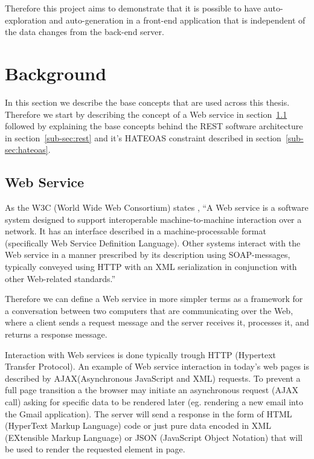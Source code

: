 Therefore this project aims to demonstrate that it is possible to have auto-exploration and auto-generation in a front-end application that is independent of the data changes from the back-end server.


\section{Background}
\label{sec:background}

In this section we describe the base concepts that are used across this thesis. Therefore we start by describing the concept of a Web service in section~\ref{sub-sec:web-service} followed by explaining the base concepts behind the REST software architecture in section~\ref{sub-sec:rest} and it's HATEOAS constraint described in section~\ref{sub-sec:hateoas}.

\subsection{Web Service}
\label{sub-sec:web-service}

As the W3C (World Wide Web Consortium) states \cite{W3C}, ``A Web service is a software system designed to support interoperable machine-to-machine interaction over a network. It has an interface described in a machine-processable format (specifically Web Service Definition Language). Other systems interact with the Web service in a manner prescribed by its description using SOAP-messages, typically conveyed using HTTP with an XML serialization in conjunction with other Web-related standards.'' 

Therefore we can define a Web service in more simpler terms as a framework for a conversation between two computers that are communicating over the Web, where a client sends a request message and the server receives it, processes it, and returns a response message.

Interaction with Web services is done typically trough HTTP (Hypertext Transfer Protocol). An example of Web service interaction in today's web pages is described by AJAX(Asynchronous JavaScript and XML) requests.   To prevent a full page transition a the browser may initiate an asynchronous request (AJAX call) asking for specific data to be rendered later (eg. rendering a new email into the Gmail application). The server will send a response in the form of HTML (HyperText Markup Language) code or just pure data encoded in XML (EXtensible Markup Language) or JSON (JavaScript Object Notation) that will be used to render the requested element in page.

